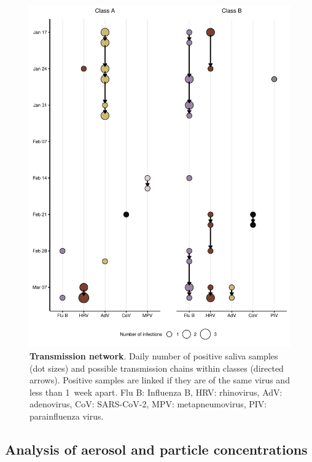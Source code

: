 \documentclass[fleqn,11pt]{wlscirep}
\begin{document}
\begin{figure}[!htpb]
    \centering
    \includegraphics{../../results/mol-data/network-plot.pdf}
    \caption{\textbf{Transmission network}. Daily number of positive saliva samples (dot sizes) and possible transmission chains within classes (directed arrows). Positive samples are linked if they are of the same virus and less than 1~week apart. Flu B: Influenza B, HRV: rhinovirus, AdV: adenovirus, CoV: SARS-CoV-2, MPV: metapneumovirus, PIV: parainfluenza virus.}
    \label{fig:molecular-network}
\end{figure}

\subsection{Analysis of aerosol and particle concentrations}
\end{document}
